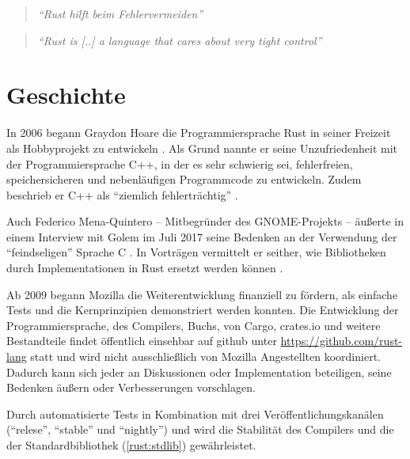 \begin{quotation}
	\textit{\enquote{Rust hilft beim Fehlervermeiden}} 
	\cite[Federico Mena-Quintero in einem Interview]{rust:c_is_hostile_golem}
\end{quotation}

\begin{quotation}
	\textit{\enquote{Rust is [..] a language that cares about very tight control}}
	\cite[Diskussion zwischen Programmierern auf Reddit]{rust:tight_control}
\end{quotation}


\clearpage
\section{Geschichte}
\label{rust:history}

In 2006 begann Graydon Hoare die Programmiersprache Rust in seiner Freizeit als Hobbyprojekt zu entwickeln \cite{rust:faq}.
Als Grund nannte er seine Unzufriedenheit mit der Programmiersprache C++, in der es sehr schwierig sei, fehlerfreien, speichersicheren und nebenläufigen Programmcode zu entwickeln.
Zudem beschrieb er C++ als \enquote{ziemlich fehlerträchtig} \cite{rust:heise_interview_graydon}.

Auch Federico Mena-Quintero -- Mitbegründer des GNOME-Projekts \cite{rust:gnome:federico}  --
äußerte in einem Interview mit Golem im Juli 2017 seine Bedenken an der Verwendung der \enquote{feindseligen} Sprache C \cite{rust:c_is_hostile_golem}.
In Vorträgen  vermittelt er seither, wie Bibliotheken durch Implementationen in Rust ersetzt werden können \cite{rust:c_is_hostile_mena}.

Ab 2009 begann Mozilla die Weiterentwicklung finanziell zu fördern, als einfache Tests und die Kernprinzipien demonstriert werden konnten.
Die Entwicklung der Programmiersprache, des Compilers, Buchs, von Cargo, crates.io und weitere Bestandteile findet öffentlich einsehbar auf \gls{github}  unter \url{https://github.com/rust-lang} statt und wird nicht ausschließlich von Mozilla Angestellten koordiniert.
Dadurch kann sich jeder an Diskussionen oder Implementation beteiligen, seine Bedenken äußern oder Verbesserungen vorschlagen.

Durch automatisierte Tests  in Kombination mit drei Veröffentlichungskanälen (\enquote{relese}, \enquote{stable} und \enquote{nightly}) und  wird die Stabilität des Compilers und die der Standardbibliothek (\autoref{rust:stdlib}) gewährleistet.

